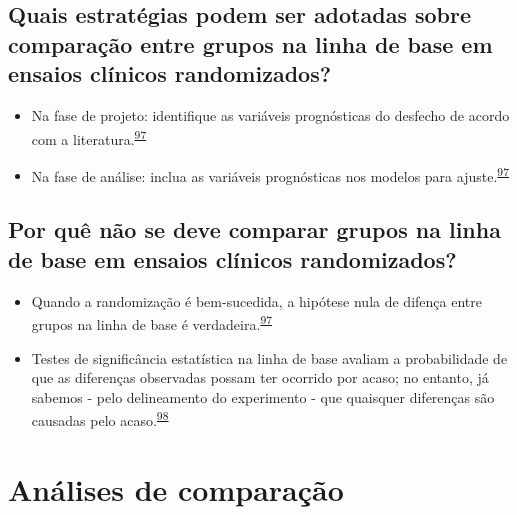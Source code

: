 \documentclass[
]{book}
\begin{document}
\hypertarget{quais-estratuxe9gias-podem-ser-adotadas-sobre-comparauxe7uxe3o-entre-grupos-na-linha-de-base-em-ensaios-cluxednicos-randomizados}{%
\subsection{Quais estratégias podem ser adotadas sobre comparação entre grupos na linha de base em ensaios clínicos randomizados?}\label{quais-estratuxe9gias-podem-ser-adotadas-sobre-comparauxe7uxe3o-entre-grupos-na-linha-de-base-em-ensaios-cluxednicos-randomizados}}

\begin{itemize}
\item
  Na fase de projeto: identifique as variáveis prognósticas do desfecho de acordo com a literatura.\textsuperscript{\protect\hyperlink{ref-roberts1999}{97}}
\item
  Na fase de análise: inclua as variáveis prognósticas nos modelos para ajuste.\textsuperscript{\protect\hyperlink{ref-roberts1999}{97}}
\end{itemize}

\hypertarget{por-quuxea-nuxe3o-se-deve-comparar-grupos-na-linha-de-base-em-ensaios-cluxednicos-randomizados}{%
\subsection{Por quê não se deve comparar grupos na linha de base em ensaios clínicos randomizados?}\label{por-quuxea-nuxe3o-se-deve-comparar-grupos-na-linha-de-base-em-ensaios-cluxednicos-randomizados}}

\begin{itemize}
\item
  Quando a randomização é bem-sucedida, a hipótese nula de difença entre grupos na linha de base é verdadeira.\textsuperscript{\protect\hyperlink{ref-roberts1999}{97}}
\item
  Testes de significância estatística na linha de base avaliam a probabilidade de que as diferenças observadas possam ter ocorrido por acaso; no entanto, já sabemos - pelo delineamento do experimento - que quaisquer diferenças são causadas pelo acaso.\textsuperscript{\protect\hyperlink{ref-gruijters2020}{98}}
\end{itemize}

\hypertarget{comparacao-pre-pos}{%
\section{Análises de comparação}\label{comparacao-pre-pos}}
\end{document}
